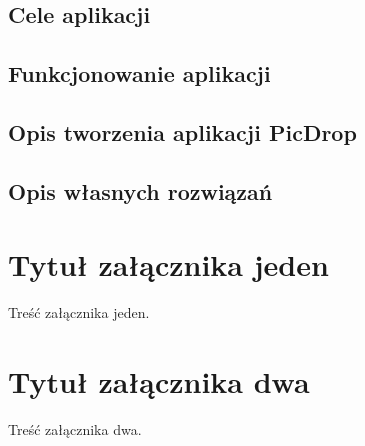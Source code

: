 \documentclass[brudnopis]{xmgr}
\begin{document}
\section{Cele aplikacji}

\section{Funkcjonowanie aplikacji}

\section{Opis tworzenia aplikacji PicDrop}

\section{Opis własnych rozwiązań}   

\summary

\appendix
\chapter{Tytuł załącznika jeden}

Treść załącznika jeden.
\chapter{Tytuł załącznika dwa}

Treść załącznika dwa.




\nocite {magiaUI}
\nocite {design}
\nocite {projektowanieUI}
\nocite {StiveKrug}
\nocite {UIRails}
\nocite {rails4angular}
\nocite {modelingUI}
\nocite{adamAnderson}
\nocite{angularRailsBootstrap}
\nocite{angularRails}
\nocite {angularDoc}
\nocite{bootstrapDoc}
\nocite {mongoDoc}
\nocite {rspecDoc}
\nocite {railsDoc}

\listoftables

\listoffigures

\oswiadczenie
\end{document}
